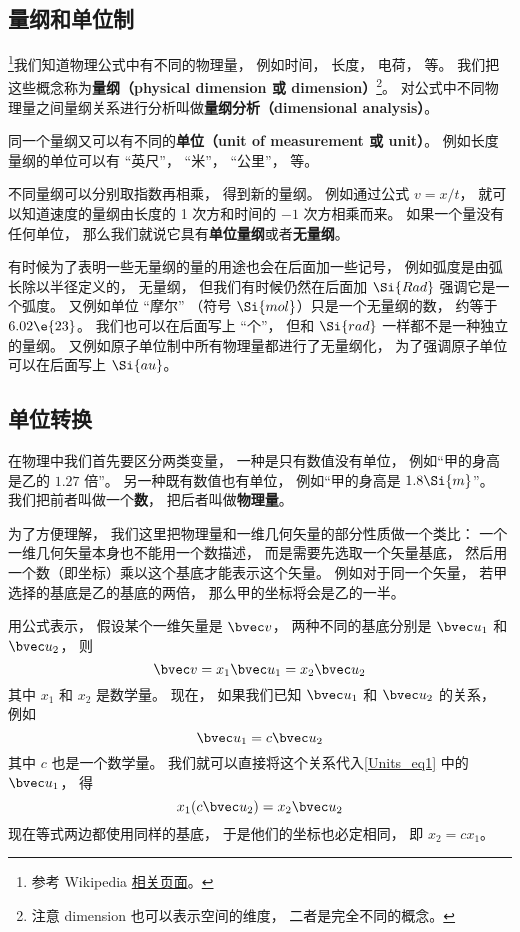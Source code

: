 
\subsection{量纲和单位制}
\footnote{参考 Wikipedia \href{https://en.wikipedia.org/wiki/Dimensional_analysis}{相关页面}。}我们知道物理公式中有不同的物理量， 例如时间， 长度， 电荷， 等。 我们把这些概念称为\textbf{量纲（physical dimension 或 dimension）}\footnote{注意 dimension 也可以表示空间的维度， 二者是完全不同的概念。}。 对公式中不同物理量之间量纲关系进行分析叫做\textbf{量纲分析（dimensional analysis）}。

同一个量纲又可以有不同的\textbf{单位（unit of measurement 或 unit）}。 例如长度量纲的单位可以有 “英尺”， “米”， “公里”， 等。

不同量纲可以分别取指数再相乘， 得到新的量纲。 例如通过公式 $v = x/t$， 就可以知道速度的量纲由长度的 1 次方和时间的 $-1$ 次方相乘而来。 如果一个量没有任何单位， 那么我们就说它具有\textbf{单位量纲}或者\textbf{无量纲}。

有时候为了表明一些无量纲的量的用途也会在后面加一些记号， 例如弧度是由弧长除以半径定义的， 无量纲， 但我们有时候仍然在后面加 $\Si{Rad}$ 强调它是一个弧度。 又例如单位 “摩尔” （符号 $\Si{mol}$）只是一个无量纲的数， 约等于 $6.02\e{23}$。 我们也可以在后面写上 “个”， 但和 $\Si{rad}$ 一样都不是一种独立的量纲。 又例如原子单位制中所有物理量都进行了无量纲化， 为了强调原子单位可以在后面写上 $\Si{au}$。

\subsection{单位转换}


在物理中我们首先要区分两类变量， 一种是只有数值没有单位， 例如“甲的身高是乙的 $1.27$ 倍”。 另一种既有数值也有单位， 例如“甲的身高是 $1.8\Si{m}$”。 我们把前者叫做一个\textbf{数}， 把后者叫做\textbf{物理量}。

为了方便理解， 我们这里把物理量和一维几何矢量的部分性质做一个类比： 一个一维几何矢量本身也不能用一个数描述， 而是需要先选取一个矢量基底， 然后用一个数（即坐标）乘以这个基底才能表示这个矢量。 例如对于同一个矢量， 若甲选择的基底是乙的基底的两倍， 那么甲的坐标将会是乙的一半。

用公式表示， 假设某个一维矢量是 $\bvec v$， 两种不同的基底分别是 $\bvec u_1$ 和 $\bvec u_2$， 则
\begin{equation}\label{Units_eq1}
\bvec v = x_1 \bvec u_1 = x_2 \bvec u_2
\end{equation}
其中 $x_1$ 和 $x_2$ 是数学量。 现在， 如果我们已知 $\bvec u_1$ 和 $\bvec u_2$ 的关系， 例如
\begin{equation}\label{Units_eq2}
\bvec u_1 = c \bvec u_2
\end{equation}
其中 $c$ 也是一个数学量。 我们就可以直接将这个关系代入\autoref{Units_eq1} 中的 $\bvec u_1$， 得
\begin{equation}
x_1 (c \bvec u_2) = x_2 \bvec u_2
\end{equation}
现在等式两边都使用同样的基底， 于是他们的坐标也必定相同， 即 $x_2 = c x_1$。

